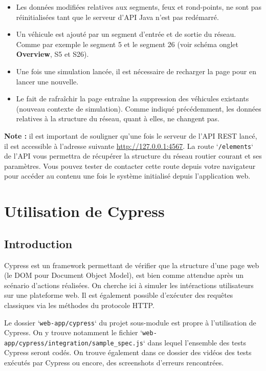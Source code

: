 \documentclass[11pt,a4paper,oneside]{article}
\begin{document}
\begin{itemize}
	\item Les données modifiées relatives aux segments, feux et rond-points, ne sont pas réinitialisées tant que le serveur d'API Java n'est pas redémarré.
	\item Un véhicule est ajouté par un segment d'entrée et de sortie du réseau. Comme par exemple le segment 5 et le segment 26 (voir schéma onglet \textbf{Overview}, S5 et S26).
	\item Une fois une simulation lancée, il est nécessaire de recharger la page pour en lancer une nouvelle.
	\item Le fait de rafraîchir la page entraîne la suppression des véhicules existants (nouveau contexte de simulation). Comme indiqué précédemment, les données relatives à la structure du réseau, quant à elles, ne changent pas.
\end{itemize}

\textbf{Note :} il est important de souligner qu'une fois le serveur de l'API REST lancé, il est accessible à l'adresse suivante \href{http://127.0.0.1:4567}{http://127.0.0.1:4567}. La route `\texttt{/elements}` de l'API vous permettra de récupérer la structure du réseau routier courant et ses paramètres. Vous pouvez tester de contacter cette route depuis votre navigateur pour accéder au contenu une fois le système initialisé depuis l'application web.

\section{Utilisation de Cypress}

\subsection{Introduction}

Cypress est un framework permettant de vérifier que la structure d'une page web (le DOM pour Document Object Model), est bien comme attendue après un scénario d'actions réalisées. On cherche ici à simuler les intéractions utilisateurs sur une plateforme web. Il est également possible d'exécuter des requêtes classiques via les méthodes du protocole HTTP.

\vspace{5mm}

Le dossier `\texttt{web-app/cypress}` du projet sous-module est propre à l'utilisation de Cypress. On y trouve notamment le fichier `\texttt{web-app/cypress/integration/sample\_spec.js}` dans lequel l'ensemble des tests Cypress seront codés. On trouve également dans ce dossier des vidéos des tests exécutés par Cypress ou encore, des screenshots d'erreurs rencontrées.
\end{document}

